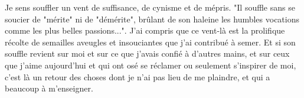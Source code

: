 Je sens souffler un vent de suffisance, de cynisme et de mépris. "Il souffle sans se soucier de "mérite" ni de "démérite", brûlant de son haleine les humbles vocations comme les plus belles passions...". J'ai compris que ce vent-là est la prolifique récolte de semailles aveugles et insouciantes que j'ai contribué à semer. Et si son souffle revient sur moi et sur ce que j'avais confié à d'autres mains, et sur ceux que j'aime aujourd'hui et qui ont osé se réclamer ou seulement s'inspirer de moi, c'est là un retour des choses dont je n'ai pas lieu de me plaindre, et qui a beaucoup à m'enseigner.

